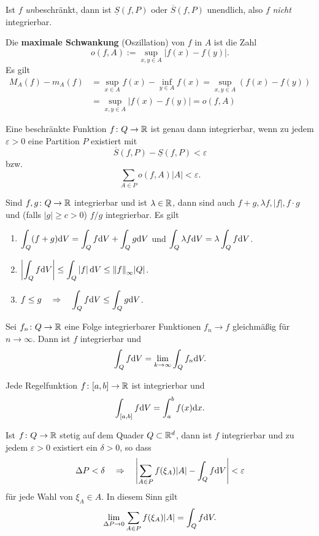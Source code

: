 Ist $f$ \textit{un}beschränkt, dann ist $\underline{S}(f,P)$ oder $\overline{S}(f,P)$ unendlich, also $f$ \textit{nicht} integrierbar.

Die \textbf{maximale Schwankung} (Oszillation) von $f$ in $A$ ist die Zahl
\[o(f,A) := \sup_{x,y \in A} |f(x) - f(y)|.\]
Es gilt 
\begin{align*}
	M_A(f) - m_A(f) &= \sup_{x \in A} f(x) - \inf_{y \in A} f(x) = \sup_{x,y\in A} (f(x) - f(y))\\
	&= \sup_{x,y \in A} |f(x) - f(y)| = o(f,A)
\end{align*}
\begin{satz}\label{satz2_3}
	Eine beschränkte Funktion $f \colon Q \to \mathbb{R}$ ist genau dann integrierbar, wenn zu jedem $\varepsilon > 0$ eine Partition $P$ existiert mit
	\[\overline{S}(f,P) - \underline{S}(f,P) < \varepsilon\]
	bzw. 
	\[\sum_{A\in P} o(f,A) |A| < \varepsilon.\]
\end{satz}
\begin{satz}\label{satz2_4}
	Sind $f,g \colon Q \to \mathbb{R}$ integrierbar und ist $\lambda \in \mathbb{R}$, dann sind auch $f+g, \lambda f, |f|, f\cdot g$ und (falls $|g| \geq c > 0$) $f/g$ integrierbar. Es gilt
	\begin{enumerate}[label=(\alph*)]
		\item\label{satz2_4_a} $\displaystyle \int_Q (f+g)\mathrm{d} V = \int_Q f \mathrm{d} V + \int_Q g \mathrm{d} V$ und $\displaystyle\int_Q \lambda f \mathrm{d} V = \lambda \int_Q f \mathrm{d} V$.
		\item $\displaystyle \left|\int_Q f \mathrm{d} V\right| \leq \int_Q \left|f\right| \mathrm{d} V \leq {\left\lVert f\right\rVert}_\infty |Q|$.
		\item\label{satz2_4_c} $\displaystyle f \leq g \quad\Rightarrow\quad \int_Q f \mathrm{d} V \leq \int_Q g \mathrm{d} V$.
	\end{enumerate}
\end{satz}
\begin{satz}\label{satz2_5}
	Sei $f_n \colon Q \to \mathbb{R}$ eine Folge integrierbarer Funktionen $f_n \to f$ gleichmäßig für $n \to \infty$. Dann ist $f$ integrierbar und 
	\[\int_Q f \mathrm{d} V = \lim_{k\to \infty} \int_Q f_n \mathrm{d} V.\]
\end{satz}
\begin{kor}
	Jede Regelfunktion $f \colon [a,b] \to \mathbb{R}$ ist integrierbar und
	\[\int_{[a,b]} f \mathrm{d} V = \int_a^b f(x) \mathrm{d} x.\]
\end{kor}
\begin{satz}\label{satz2_7}
	Ist $f \colon Q \to \mathbb{R}$ stetig auf dem Quader $Q \subset \mathbb{R}^d$, dann ist $f$ integrierbar und zu jedem $\varepsilon > 0$ existiert ein $\delta > 0$, so dass 
	\[\Delta P < \delta \quad\Rightarrow\quad \left|\sum_{A\in P} f(\xi_A) |A| - \int_Q f \mathrm{d} V\right| < \varepsilon\]
	für jede Wahl von $\xi_A \in A$. In diesem Sinn gilt
	\[\lim_{\Delta P \to 0} \sum_{A \in P}f(\xi_A)|A| = \int_Q f \mathrm{d} V.\]
\end{satz}

